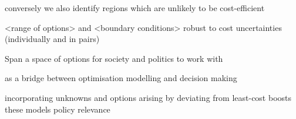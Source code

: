 conversely we also identify regions which are unlikely to be cost-efficient

<range of options> and <boundary conditions> robust to cost uncertainties (individually and in pairs)

Span a space of options for society and politics to work with

as a bridge between optimisation modelling and decision making

incorporating unknowns and options arising by deviating from least-cost
boosts these models policy relevance

